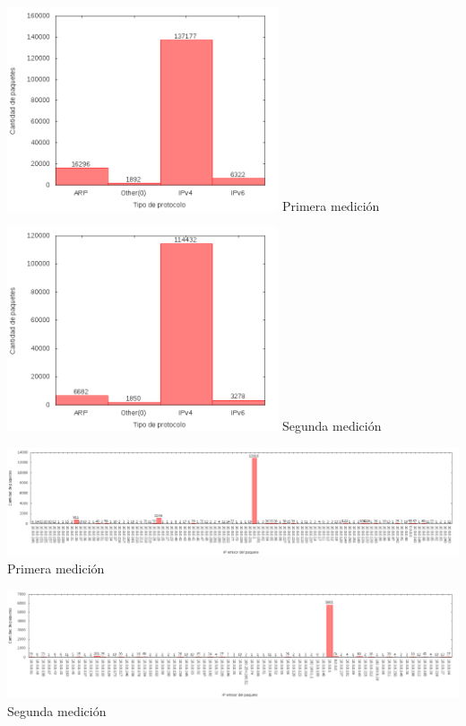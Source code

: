 \begin{minipage}{8cm}
  \centering
  \includegraphics[width=8cm]{../mediciones/job1/type.png}
  Primera medición
\end{minipage}%
\begin{minipage}{8cm}
  \centering
  \includegraphics[width=8cm]{../mediciones/job2/type.png}
  Segunda medición
\end{minipage}


\begin{center}
\includegraphics[width=16cm]{../mediciones/job1/src.png}
Primera medición
\end{center}

\begin{center}
\includegraphics[width=16cm]{../mediciones/job2/src.png}
Segunda medición
\end{center}

